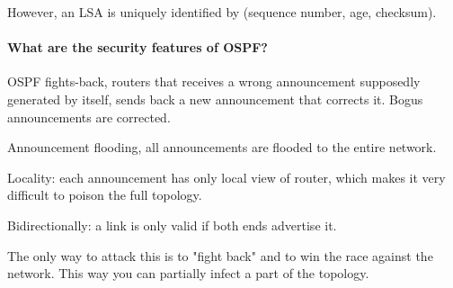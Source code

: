 However, an LSA is uniquely identified by (sequence number, age, checksum).

\paragraph{What are the security features of OSPF?}
OSPF fights-back, routers that receives a wrong announcement supposedly generated by itself, sends back a new announcement that corrects it. Bogus announcements are corrected.

Announcement flooding, all announcements are flooded to the entire network. 

Locality: each announcement has only local view of router, which makes it very difficult to poison the full topology.

Bidirectionally: a link is only valid if both ends advertise it.

The only way to attack this is to "fight back" and to win the race against the network. This way you can partially infect a part of the topology.